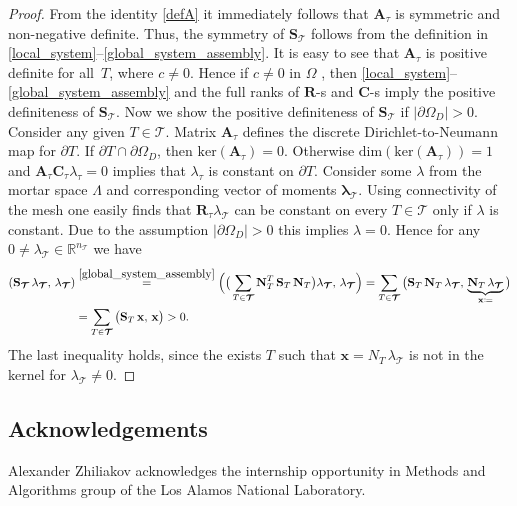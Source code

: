 \documentclass[12pt]{article}
\newcommand{\vect}[1]{\boldsymbol{\mathbf{#1}}}
\newcommand{\bcell}{T}
\newcommand{\bmesh}{{\vect{\mathcal T}}}
\newcommand{\mmesh}{{\vect{\mathcal \tau}}}
\DeclareMathOperator{\Ker}{Ker}
\begin{document}
\begin{proof}
		From the identity \eqref{defA} it immediately follows that $\vect A_{\mmesh}$ is symmetric and non-negative definite.  Thus, the symmetry of $\vect S_\bmesh$ follows from the definition in \eqref{local_system}--\eqref{global_system_assembly}.
It is easy to see that $\vect A_{\mmesh}$ is positive definite for all~$\bcell$, where $c \ne 0$. Hence if $c \ne 0$ in $\Omega$ , then \eqref{local_system}--\eqref{global_system_assembly} and the full ranks of $\vect R$-s and $\vect C$-s imply
the positive definiteness of $\vect S_\bmesh$.
Now we show the positive definiteness of $\vect S_\bmesh$ if $|\partial\Omega_D|>0 $. Consider  any given $\bcell\in\bmesh$.
Matrix  $\vect A_{\mmesh}$ defines the discrete Dirichlet-to-Neumann map for $\partial\bcell$.
If $\partial\bcell\cap\partial\Omega_D$, then $\mbox{ker}(\vect A_{\mmesh})=0$. Otherwise $\mbox{dim}(\mbox{ker}(\vect A_{\mmesh}))=1$ and $\vect A_{\mmesh}\vect C_{\mmesh}\lambda_\mmesh=0$ implies that $\lambda_\mmesh$ is constant on $\partial\bcell$. Consider some $\lambda$ from the mortar space $\Lambda$ and corresponding vector of moments  $\vect \lambda_\bmesh$. Using connectivity of the mesh one easily finds that $\vect R_\mmesh \lambda_\bmesh$ can be constant on every $T\in\bmesh$ only if $\lambda$ is constant. Due to the assumption $|\partial\Omega_D|>0 $ this implies $\lambda=0$.
Hence for any $0\neq\lambda_\bmesh\in \mathbb{R}^{n_\bmesh}$ we have
		\begin{align*}
			\left(\vect S_\bmesh\,\lambda_\bmesh,\,\lambda_\bmesh\right) &\stackrel{\eqref{global_system_assembly}}{=}
			\Big( \big( \sum_{\bcell \in \bmesh} \vect N^T_\bcell\,\vect S_\bcell\,\vect N_\bcell \big){\lambda_\bmesh},\,{\lambda_\bmesh} \Big) =
			\sum_{\bcell \in \bmesh} \big( \vect S_\bcell\,\vect N_\bcell\,{\lambda_\bmesh},\,\underbrace{\vect N_\bcell\,{\lambda_\bmesh}}_{{\vect x} \coloneqq} \big)\\
& =
			\sum_{\bcell \in \bmesh} \big(\vect S_\bcell\,{\vect x},\,{\vect x} \big) > 0.
		\end{align*}
The last inequality holds, since the exists $\bcell$ such that $\vect x=N_\bcell\,{\lambda_\bmesh}$ is not in the kernel for $\lambda_\bmesh\neq0$.
	\end{proof}




        

 \subsection*{Acknowledgements} Alexander Zhiliakov acknowledges the internship opportunity in Methods and Algorithms group of the Los Alamos National Laboratory.


		
\end{document}
